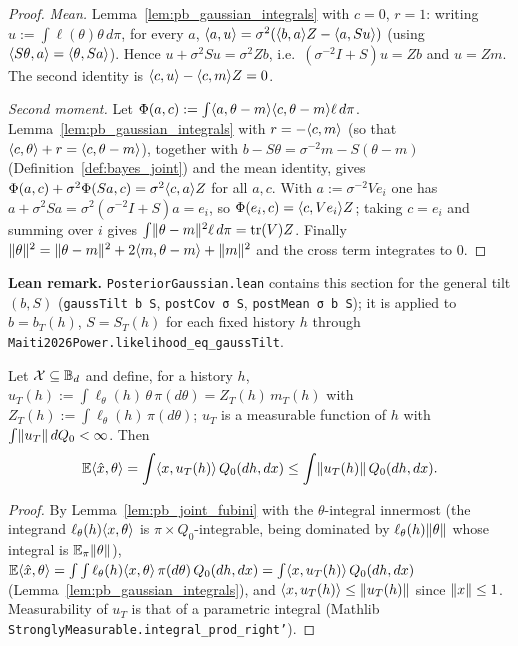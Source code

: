 \begin{proof}
\leanok
{}
\emph{Mean.} Lemma~\ref{lem:pb_gaussian_integrals} with $c = 0$, $r = 1$: writing
$u := \int\ell(\theta)\theta\,d\pi$, for every $a$,
$\langle a, u \rangle = \sigma^2(\langle b, a \rangle Z - \langle a, Su \rangle)$ (using $\langle S\theta, a \rangle = \langle \theta, Sa \rangle$).
Hence $u + \sigma^2Su = \sigma^2Zb$, i.e.\ $(\sigma^{-2}I+S)u = Zb$ and $u = Zm$. The second
identity is $\langle c, u \rangle - \langle c, m \rangle Z = 0$.

\emph{Second moment.} Let $\Phi(a,c) := \int\langle a, \theta-m \rangle\langle c, \theta-m \rangle\ell\,d\pi$.
Lemma~\ref{lem:pb_gaussian_integrals} with $r = -\langle c, m \rangle$ (so that
$\langle c, \theta \rangle+r = \langle c, \theta-m \rangle$), together with
$b - S\theta = \sigma^{-2}m - S(\theta-m)$ (Definition~\ref{def:bayes_joint}) and the mean
identity, gives $\Phi(a,c) + \sigma^2\Phi(Sa,c) = \sigma^2\langle c, a \rangle Z$ for all $a, c$. With
$a := \sigma^{-2}Ve_i$ one has $a + \sigma^2Sa = \sigma^2(\sigma^{-2}I+S)a = e_i$, so
$\Phi(e_i,c) = \langle c, Ve_i \rangle Z$; taking $c = e_i$ and summing over $i$ gives
$\int\lVert \theta-m \rVert^2\ell\,d\pi = \operatorname{tr}(V)Z$. Finally
$\lVert \theta \rVert^2 = \lVert \theta-m \rVert^2 + 2\langle m, \theta-m \rangle + \lVert m \rVert^2$ and the cross term
integrates to $0$.
\end{proof}

\textbf{Lean remark.} \texttt{PosteriorGaussian.lean} contains this section for the general tilt
$(b, S)$ (\texttt{gaussTilt b S}, \texttt{postCov σ S}, \texttt{postMean σ b S}); it is applied
to $b = b_T(h)$, $S = S_T(h)$ for each fixed history $h$ through
\texttt{Maiti2026Power.likelihood\_eq\_gaussTilt}.

\begin{lemma}\label{lem:posterior_mean}
\leanok
{}
Let $\mathcal{X} \subseteq \mathbb{B}_d$ and define, for a history $h$,
$u_T(h) := \int\ell_\theta(h)\,\theta\,\pi(d\theta) = Z_T(h)\,m_T(h)$ with
$Z_T(h) := \int\ell_\theta(h)\,\pi(d\theta)$; $u_T$ is a measurable function of $h$ with
$\int\lVert u_T \rVert\,dQ_0 < \infty$. Then
\[
  \mathbb{E}\langle \hat{x}, \theta \rangle = \int\langle x, u_T(h) \rangle\,Q_0(dh,dx) \le \int\lVert u_T(h) \rVert\,Q_0(dh,dx) .
\]
\end{lemma}

\begin{proof}
\leanok
{}
By Lemma~\ref{lem:pb_joint_fubini} with the $\theta$-integral innermost (the integrand
$\ell_\theta(h)\langle x, \theta \rangle$ is $\pi\times Q_0$-integrable, being dominated by
$\ell_\theta(h)\lVert \theta \rVert$ whose integral is $\mathbb{E}_\pi\lVert \theta \rVert$),
$\mathbb{E}\langle \hat{x}, \theta \rangle = \int\int\ell_\theta(h)\langle x, \theta \rangle\,\pi(d\theta)\,Q_0(dh,dx)
= \int\langle x, u_T(h) \rangle\,Q_0(dh,dx)$ (Lemma~\ref{lem:pb_gaussian_integrals}), and
$\langle x, u_T(h) \rangle \le \lVert u_T(h) \rVert$ since $\lVert x \rVert\le1$. Measurability of $u_T$ is that of a
parametric integral (Mathlib \texttt{StronglyMeasurable.integral\_prod\_right'}).
\end{proof}

